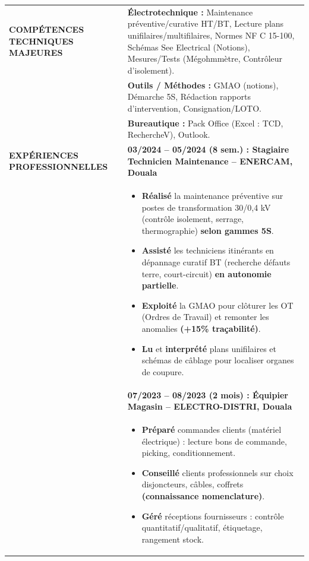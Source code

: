 \documentclass[11pt]{article}
\newcommand{\cle}[1]{{\popxbold\color{popdark}#1}}
\begin{document}
\begin{exoresolu}
\vspace{0.3cm}
\begin{center}
\begin{tabularx}{\linewidth}{|l|X|}\hline
\textbf{COMPÉTENCES TECHNIQUES MAJEURES} & \textbf{Électrotechnique :} Maintenance préventive/curative HT/BT, Lecture plans unifilaires/multifilaires, Normes NF C 15-100, Schémas \cle{See Electrical (Notions)}, Mesures/Tests (Mégohmmètre, Contrôleur d'isolement). \\
& \textbf{Outils / Méthodes :} GMAO (notions), Démarche 5S, Rédaction rapports d'intervention, Consignation/LOTO. \\
& \textbf{Bureautique :} Pack Office (Excel : TCD, RechercheV), Outlook. \\ \hline
\textbf{EXPÉRIENCES PROFESSIONNELLES} & \textbf{03/2024 -- 05/2024 (8 sem.) : Stagiaire Technicien Maintenance -- ENERCAM, Douala} \\
& \begin{itemize}[leftmargin=*, label=--]
    \item \textbf{Réalisé} la maintenance préventive sur postes de transformation 30/0,4 kV (contrôle isolement, serrage, thermographie) \textbf{selon gammes 5S}.
    \item \textbf{Assisté} les techniciens itinérants en dépannage curatif BT (recherche défauts terre, court-circuit) \textbf{en autonomie partielle}.
    \item \textbf{Exploité} la GMAO pour clôturer les OT (Ordres de Travail) et remonter les anomalies \textbf{(+15\% traçabilité)}.
    \item \textbf{Lu} et \textbf{interprété} plans unifilaires et schémas de câblage pour localiser organes de coupure.
\end{itemize} \\
& \textbf{07/2023 -- 08/2023 (2 mois) : Équipier Magasin -- ELECTRO-DISTRI, Douala} \\
& \begin{itemize}[leftmargin=*, label=--]
    \item \textbf{Préparé} commandes clients (matériel électrique) : lecture bons de commande, picking, conditionnement.
    \item \textbf{Conseillé} clients professionnels sur choix disjoncteurs, câbles, coffrets \textbf{(connaissance nomenclature)}.
    \item \textbf{Géré} réceptions fournisseurs : contrôle quantitatif/qualitatif, étiquetage, rangement stock.
\end{itemize} \\ \hline

\end{tabularx}
\end{center}
\end{exoresolu}
\end{document}

